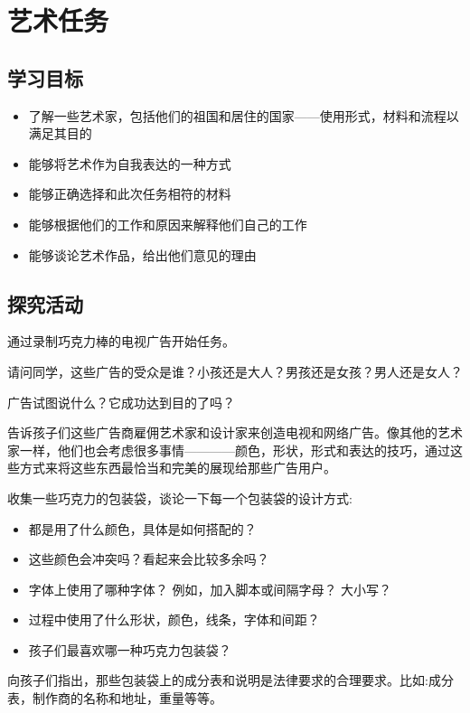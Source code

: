 \chapter{艺术任务}


\section{学习目标}


\begin{itemize}
  \item 了解一些艺术家，包括他们的祖国和居住的国家——使用形式，材料和流程以满足其目的
  \item 能够将艺术作为自我表达的一种方式
  \item 能够正确选择和此次任务相符的材料
  \item 能够根据他们的工作和原因来解释他们自己的工作
  \item 能够谈论艺术作品，给出他们意见的理由
\end{itemize}



\section{探究活动}
   通过录制巧克力棒的电视广告开始任务。\par
   请问同学，这些广告的受众是谁？小孩还是大人？男孩还是女孩？男人还是女人？\par
   广告试图说什么？它成功达到目的了吗？\par
   告诉孩子们这些广告商雇佣艺术家和设计家来创造电视和网络广告。像其他的艺术家一样，他们也会考虑很多事情————颜色，形状，形式和表达的技巧，通过这些方式来将这些东西最恰当和完美的展现给那些广告用户。\par
   收集一些巧克力的包装袋，谈论一下每一个包装袋的设计方式:\par
   \begin{itemize}
     \item 都是用了什么颜色，具体是如何搭配的？
     \item 这些颜色会冲突吗？看起来会比较多余吗？
     \item 字体上使用了哪种字体？ 例如，加入脚本或间隔字母？ 大小写？
     \item 过程中使用了什么形状，颜色，线条，字体和间距？
     \item 孩子们最喜欢哪一种巧克力包装袋？
   \end{itemize}   
   向孩子们指出，那些包装袋上的成分表和说明是法律要求的合理要求。比如:成分表，制作商的名称和地址，重量等等。\par
   

